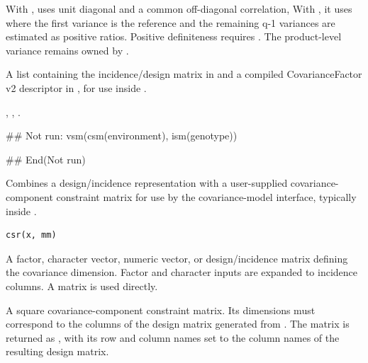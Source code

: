 \documentclass[a4paper]{book}
\begin{document}
%
\begin{Details}\relax
With ,  uses unit diagonal and a common off-diagonal correlation,  With , it uses  where the first variance is the reference and the remaining q-1 variances are estimated as positive ratios. Positive definiteness requires . The product-level variance remains owned by .
\end{Details}
%
\begin{Value}
A list containing the incidence/design matrix in  and a compiled CovarianceFactor v2 descriptor in , for use inside .
\end{Value}
%
\begin{SeeAlso}\relax
{}, , .
\end{SeeAlso}
%
\begin{Examples}
\begin{ExampleCode}
## Not run: 
vsm(csm(environment), ism(genotype))

## End(Not run)
\end{ExampleCode}
\end{Examples}
%
\begin{Description}\relax
Combines a design/incidence representation with a user-supplied covariance-component constraint matrix for use by the  covariance-model interface, typically inside .
\end{Description}
%
\begin{Usage}
\begin{verbatim}
csr(x, mm)
\end{verbatim}
\end{Usage}
%
\begin{Arguments}
\begin{ldescription}
\item[\code{x}] 
A factor, character vector, numeric vector, or design/incidence matrix defining the covariance dimension. Factor and character inputs are expanded to incidence columns. A matrix is used directly.

\item[\code{mm}] 
A square covariance-component constraint matrix. Its dimensions must correspond to the columns of the design matrix generated from . The matrix is returned as , with its row and column names set to the column names of the resulting design matrix.

\end{ldescription}
\end{Arguments}
\end{document}

